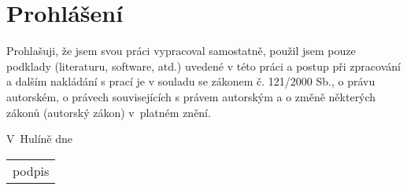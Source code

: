 \vfill

\vglue 13cm

\section*{Prohlášení}

\begin{spacing}{1.3}
	 Prohlašuji, že jsem svou práci vypracoval samostatně, použil jsem pouze podklady (literaturu, software, atd.) uvedené v této práci a postup při zpracování a dalším nakládání s prací je v souladu se zákonem č. 121/2000 Sb., o právu autorském, o právech souvisejících s právem autorským a o změně některých zákonů (autorský zákon) v~platném znění. 
\end{spacing}

\vspace{1.5cm}

V~Hulíně dne \Podepsano

\begin{flushright}
	\vspace{-1.5cm}
	\begin{tabular}{p{3.5cm}}
		\\
		\hline
		\hspace{1cm} podpis
	\end{tabular}
	\hspace*{0.5cm}
\end{flushright}
